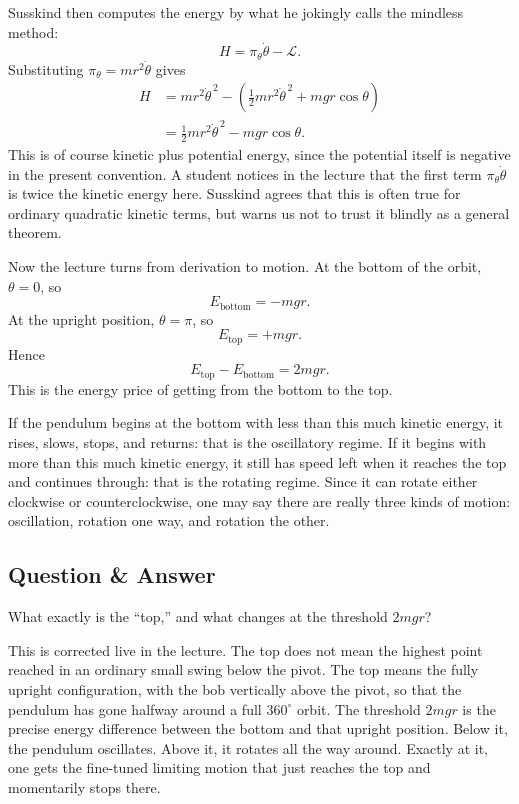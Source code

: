 Susskind then computes the energy by what he jokingly calls the mindless method:
\begin{equation}
H=\pi_\theta\dot\theta-\mathcal{L}.
\end{equation}
Substituting \(\pi_\theta=mr^2\dot\theta\) gives
\begin{align}
H
&=
mr^2\dot\theta^{\,2}
-
\left(
\frac12 mr^2\dot\theta^{\,2}+mgr\cos\theta
\right)\\
&=
\frac12 mr^2\dot\theta^{\,2}-mgr\cos\theta.
\end{align}
This is of course kinetic plus potential energy, since the potential itself is negative in the present convention. A student notices in the lecture that the first term \(\pi_\theta\dot\theta\) is twice the kinetic energy here. Susskind agrees that this is often true for ordinary quadratic kinetic terms, but warns us not to trust it blindly as a general theorem.

Now the lecture turns from derivation to motion. At the bottom of the orbit, \(\theta=0\), so
\begin{equation}
E_{\text{bottom}}=-mgr.
\end{equation}
At the upright position, \(\theta=\pi\), so
\begin{equation}
E_{\text{top}}=+mgr.
\end{equation}
Hence
\begin{equation}
E_{\text{top}}-E_{\text{bottom}}=2mgr.
\end{equation}
This is the energy price of getting from the bottom to the top.

If the pendulum begins at the bottom with less than this much kinetic energy, it rises, slows, stops, and returns: that is the oscillatory regime. If it begins with more than this much kinetic energy, it still has speed left when it reaches the top and continues through: that is the rotating regime. Since it can rotate either clockwise or counterclockwise, one may say there are really three kinds of motion: oscillation, rotation one way, and rotation the other.

\subsection{Question \& Answer}

What exactly is the ``top,'' and what changes at the threshold \(2mgr\)?

This is corrected live in the lecture. The top does not mean the highest point reached in an ordinary small swing below the pivot. The top means the fully upright configuration, with the bob vertically above the pivot, so that the pendulum has gone halfway around a full \(360^\circ\) orbit. The threshold \(2mgr\) is the precise energy difference between the bottom and that upright position. Below it, the pendulum oscillates. Above it, it rotates all the way around. Exactly at it, one gets the fine-tuned limiting motion that just reaches the top and momentarily stops there.

